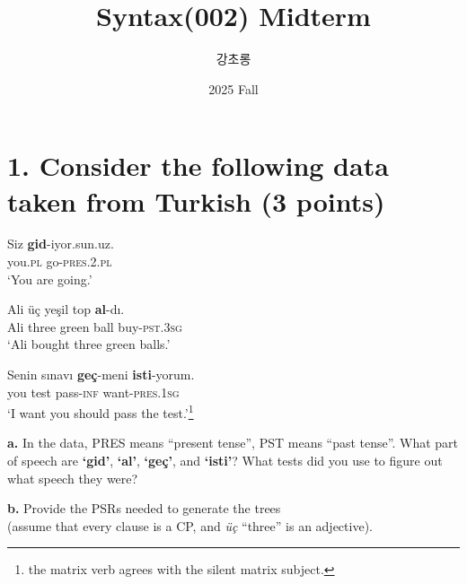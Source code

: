 \documentclass{article}
\newcommand{\glabbr}[1]{\textsc{\MakeLowercase{#1}}}
\begin{document}
\large

\title{Syntax(002) Midterm}
\author{강초롱}
\date{2025 Fall}
\maketitle
\thispagestyle{fancy}
\bigskip

\section{1. Consider the following data taken from Turkish \normalsize(3 points)}
\medskip 
\begin{exe}
  \ex
  \gll Siz \textbf{gid}-iyor.sun.uz.\\
       you.\glabbr{PL} go-\glabbr{PRES}.2.\glabbr{PL}\\
  \glt `You are going.'

  \ex
  \gll Ali \"{u}\c{c} ye\c{s}il top \textbf{al}-d\i.\\
       Ali three green ball buy-\glabbr{PST}.3\glabbr{SG}\\
  \glt `Ali bought three green balls.'

  \ex
  \gll Senin s\i{}nav\i{} \textbf{ge\c{c}}-meni
       \textbf{isti}-yorum.\\
       you test pass-\glabbr{INF} want-\glabbr{PRES}.1\glabbr{SG}\\
  \glt `I want you should pass the test.'\footnote{the matrix verb agrees with the silent matrix subject.}
\end{exe}
\bigskip
\noindent \textbf{a.} In the data, PRES means ``present tense'', PST means ``past tense''. 
What part of speech are \textbf{`gid'}, \textbf{`al'}, \textbf{`ge\c{c}'}, and \textbf{`isti'}? 
What tests did you use to figure out what speech they were? \par
\vspace{3cm}
\noindent \textbf{b.} Provide the PSRs needed to generate the trees \\(assume that every clause is a CP, and \textit{\"{u}\c{c}} ``three'' is an adjective). \par

\newpage
\end{document}

